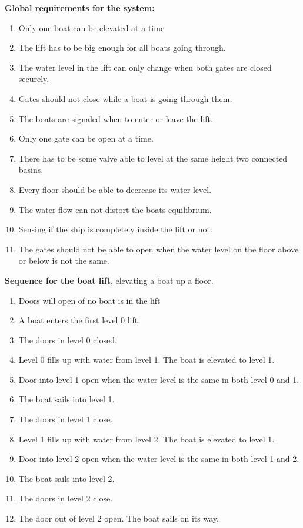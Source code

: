 \documentclass{article}
\begin{document}
\textbf{Global requirements for the system:}
\begin{enumerate}
	\item Only one boat can be elevated at a time
	\item The lift has to be big enough for all boats going through.
	\item The water level in the lift can only change when both gates are closed securely.
	\item Gates should not close while a boat is going through them.
	\item The boats are signaled when to enter or leave the lift.
	\item Only one gate can be open at a time.
	\item There has to be some valve able to level at the same height two connected basins.
	\item Every floor should be able to decrease its water level.
	\item The water flow can not distort the boats equilibrium.
	\item Sensing if the ship is completely inside the lift or not.
	\item The gates should not be able to open when the water level on the floor above or below is not the same.
	
\end{enumerate}

\pagebreak

\textbf{Sequence for the boat lift}, elevating a boat up a floor.

\begin{enumerate}
	\item Doors will open of no boat is in the lift
	\item A boat enters the first level 0 lift.
	\item The doors in level 0 closed.
	
	\item Level 0 fills up with water from level 1. The boat is elevated to level 1.
	\item Door into level 1 open when the water level is the same in both level 0 and 1.
	\item The boat sails into level 1.
	\item The doors in level 1 close.
	
	\item Level 1 fills up with water from level 2. The boat is elevated to level 1.
	\item Door into level 2 open when the water level is the same in both level 1 and 2.
	\item The boat sails into level 2.
	\item The doors in level 2 close.
	
	\item The door out of level 2 open. The boat sails on its way. 
\end{enumerate}
\end{document}
